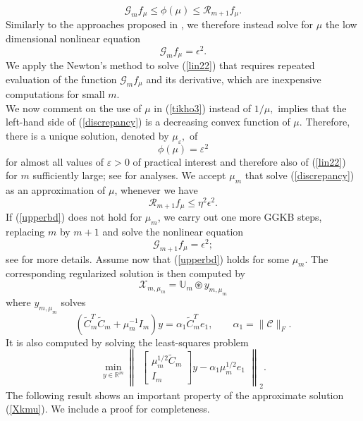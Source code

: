 \documentclass{siamltex}
\newcommand{\1}{\mathbb{1}}
\newcommand{\0}{\mathbb{0}}
\begin{document}
	\begin{equation}
	\mathcal{G}_m f_\mu\leq\phi(\mu)\leq{\mathcal R}_{m+1}f_\mu.
	\end{equation}
	Similarly to the approaches proposed  in \cite{belguide, belguide2}, we therefore instead  solve for $\mu$ the low dimensional nonlinear equation
	\begin{equation}\label{lin22}
	{\mathcal G}_m f_\mu=\epsilon^2.
	\end{equation}
	We apply the Newton's method to solve (\ref{lin22}) that requires repeated evaluation of the function ${\mathcal G}_m f_\mu$ and its derivative, which are inexpensive computations for small $m$.\\
	We now comment on the use of  $\mu$ in (\ref{tikho3}) instead of $1 / \mu,$ implies that the left-hand side of (\ref{discrepancy}) is a decreasing convex function of $\mu .$ Therefore, there is a unique solution, denoted by $\mu_{\varepsilon},$ of
	$$
	\phi(\mu)=\varepsilon^{2}
	$$
	for almost all values of $\varepsilon>0$ of practical interest and therefore also of (\ref{lin22}) for $m$ sufficiently large; see \cite{belguide, belguide2} for analyses.  We accept $\mu_m$ that solve (\ref{discrepancy}) as an approximation of $\mu$, whenever we have
	\begin{equation}\label{upperbd}
	{\mathcal R}_{m+1}f_{\mu}\leq\eta^2\epsilon^2. 
	\end{equation}
	If (\ref{upperbd}) does not hold for $\mu_m$, we carry out one more GGKB steps, replacing $m$ by $m+1$ and solve the nonlinear equation
	\begin{equation}\label{}
	{\mathcal G}_{m+1}f_\mu=\epsilon^2;
	\end{equation}
	see \cite{belguide, belguide2} for more details. Assume now that (\ref{upperbd}) holds for some $\mu_m$. The corresponding regularized solution is then computed by
	\begin{equation}\label{Xkmu}
	\mathscr {X}_{m,\mu_m}=\mathbb{U}_m \circledast y_{m,\mu_m}
	\end{equation}
	where $y_{m,\mu_m}$ solves 
	\begin{equation}\label{normeq2}
	(\widetilde{C}_m^T\widetilde{C}_m+\mu_m^{-1} I_m)y=\alpha_1\widetilde{C}_m^Te_1,\qquad\alpha_1=\|\mathscr{C}\|_F.
	\end{equation}
	It is also computed by solving the least-squares problem
	\begin{equation}\label{leastsq}
	\min_{y\in\mathbb{R}^m} \begin{Vmatrix}
	\begin{bmatrix}
	\mu_m^{1/2}\widetilde{C}_m\\
	I_m
	\end{bmatrix}
	y-\alpha_1\mu_m^{1/2}e_1 \end{Vmatrix}_2.
	\end{equation}The following result shows an important property of the approximate solution (\ref{Xkmu}). We include a proof for completeness.
	
\end{document}
